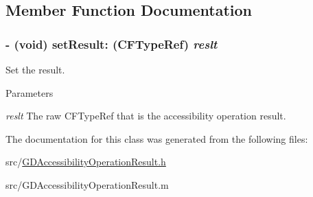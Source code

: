 \subsection{Member Function Documentation}
\hypertarget{interface_g_d_accessibility_operation_result_abc0beacffc69b1116f6a332b26b0aeb8}{
\subsubsection[{setResult:}]{\setlength{\rightskip}{0pt plus 5cm}-\/ (void) setResult: (CFTypeRef) {\em reslt}}}
\label{interface_g_d_accessibility_operation_result_abc0beacffc69b1116f6a332b26b0aeb8}


Set the result. 
\begin{DoxyParams}{Parameters}
\item[{\em reslt}]The raw CFTypeRef that is the accessibility operation result. \end{DoxyParams}


The documentation for this class was generated from the following files:\begin{DoxyCompactItemize}
\item 
src/\hyperlink{_g_d_accessibility_operation_result_8h}{GDAccessibilityOperationResult.h}\item 
src/GDAccessibilityOperationResult.m\end{DoxyCompactItemize}

